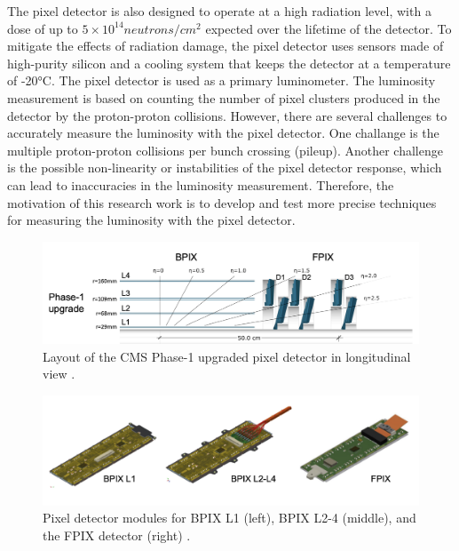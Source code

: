 The pixel detector is also designed to operate at a high radiation level, with a dose of up to $5 \times 10^{14} neutrons/cm^2$ expected over the lifetime of the detector. To mitigate the effects of radiation damage, the pixel detector uses sensors made of high-purity silicon and a cooling system that keeps the detector at a temperature of -20°C. The pixel detector is  used as a primary luminometer. The luminosity measurement is based on counting the number of pixel clusters produced in the detector by the proton-proton collisions.  However, there are several challenges to accurately measure the luminosity with the pixel detector. One challange is the multiple proton-proton collisions per bunch crossing (pileup). Another challenge is the possible non-linearity or instabilities of the pixel detector response, which can lead to inaccuracies in the luminosity measurement. Therefore, the motivation of this research work is to develop and test more precise techniques for measuring the luminosity with the pixel detector.

\begin{figure}[!htp]
\centering
\includegraphics[width=1\textwidth]{ashish_thesis/phaseI_upgrade_pixel_detector.png}
\caption[Pixel Detector Layout]{%
   Layout of the CMS Phase-1 upgraded pixel detector in longitudinal view \cite{Adam:2748381}. 
}
\label{fig:phaseI_upgrade}
\end{figure}


\begin{figure}[!htp]
\centering
\includegraphics[width=1\textwidth]{ashish_thesis/silicon_pixel_module.png}
\caption[Pixel Module Design]{%
   Pixel detector modules for BPIX L1 (left), BPIX L2-4 (middle), and
the FPIX detector (right) \cite{Adam:2748381}. 
}
\label{fig:pixelmodule}
\end{figure}


